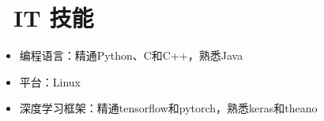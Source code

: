 \documentclass{resume}
\begin{document}
\section{\faCogs\ IT 技能}
\begin{itemize}[parsep=0.5ex]
  \item 编程语言：精通Python、C和C++，熟悉Java
  \item 平台：Linux
  \item 深度学习框架：精通tensorflow和pytorch，熟悉keras和theano
\end{itemize}


%
%
\end{document}
